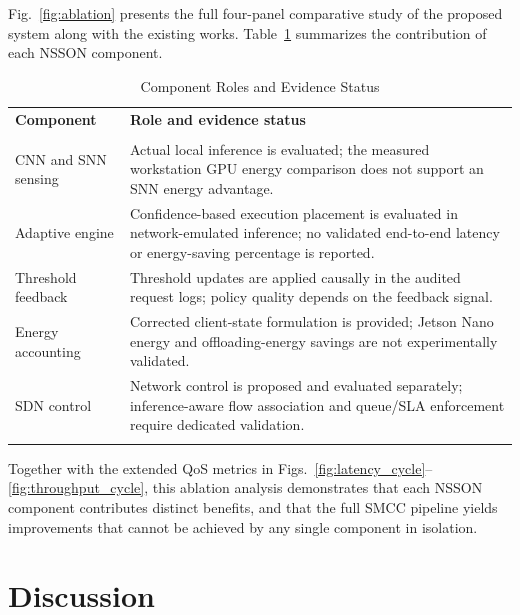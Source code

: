\documentclass[journal]{IEEEtran}
\begin{document}
Fig.~\ref{fig:ablation} presents the full four-panel comparative study of the proposed system along with the existing works.
Table~\ref{tab:ablation} summarizes the contribution of each NSSON component.
\begin{table}[!t]
\caption{Component Roles and Evidence Status}
\label{tab:ablation}
\centering
\renewcommand{\arraystretch}{1.2}
\begin{tabular}{p{2.5cm}p{5.2cm}}
\toprule
\textbf{Component} & \textbf{Role and evidence status} \\ \\
\midrule
CNN and SNN sensing & Actual local inference is evaluated; the measured workstation GPU energy comparison does not support an SNN energy advantage. \\
Adaptive engine & Confidence-based execution placement is evaluated in network-emulated inference; no validated end-to-end latency or energy-saving percentage is reported. \\
Threshold feedback & Threshold updates are applied causally in the audited request logs; policy quality depends on the feedback signal. \\
Energy accounting & Corrected client-state formulation is provided; Jetson Nano energy and offloading-energy savings are not experimentally validated. \\
SDN control & Network control is proposed and evaluated separately; inference-aware flow association and queue/SLA enforcement require dedicated validation. \\ \\
\bottomrule
\end{tabular}
\end{table}


Together with the extended QoS metrics in Figs.~\ref{fig:latency_cycle}–\ref{fig:throughput_cycle}, this ablation analysis demonstrates that each NSSON component contributes distinct benefits, and that the full SMCC pipeline yields improvements that cannot be achieved by any single component in isolation.

\section{Discussion}
\label{sec:discussion}
\end{document}
